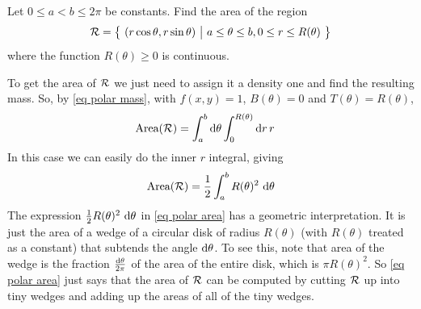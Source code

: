 \begin{eg}\label{eg polar area}
Let $0\le a<b\le 2\pi$ be constants. Find the area of the 
region
\begin{equation*}
\mathcal{R}=\big\{ \ (r\cos\theta,r\sin\theta)\ \big|\ a\le\theta\le b, 
              0\le r\le R(\theta)\ \big\}
\end{equation*}
where the function  $R(\theta)\ge 0$ is continuous.

\soln To get the area of $\mathcal{R}$ we just need to assign it a density
one and find the resulting mass. So, by \eqref{eq polar mass},
with $f(x,y)=1$, $B(\theta)=0$ and $T(\theta)=R(\theta)$, 
\begin{align*}
\text{Area}(\mathcal{R}) &= \int_a^b  \mathrm{d}\theta 
             \int_0^{R(\theta)}  \mathrm{d}r\,r
\end{align*}
In this case we can easily do the inner $r$ integral, giving
\begin{equation*}
\text{Area}(\mathcal{R}) =\frac{1}{2} \int_a^b R(\theta)^2\  \mathrm{d}\theta 
\end{equation*}
The expression $\frac{1}{2} R(\theta)^2\ \mathrm{d}\theta$ in
\eqref{eq polar area} has a geometric interpretation. It is just 
the area of a wedge of a circular disk of radius $R(\theta)$ 
(with $R(\theta)$ treated as a constant) that subtends the 
angle $\mathrm{d}\theta$. 
To see this, note that area of the wedge 
is the fraction $\frac{\mathrm{d}\theta}{2\pi}$
of the area of the entire disk, which is $\pi R(\theta)^2$.
So \eqref{eq polar area} just says that the area of $\mathcal{R}$ can be computed
by cutting $\mathcal{R}$ up into tiny wedges and adding up the areas of all of the
tiny wedges. 


\end{eg}


